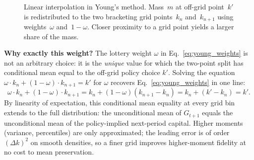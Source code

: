 \documentclass[11pt,a4paper]{report}
\newcommand{\x}{\bm{x}}
\begin{document}
\begin{figure}[ht]
\centering
{}
\caption{Linear interpolation in Young's method.  Mass~$m$ at off-grid point~$k'$ is redistributed to the two bracketing grid points~$k_n$ and~$k_{n+1}$ using weights~$\omega$ and~$1-\omega$.  Closer proximity to a grid point yields a larger share of the mass.}
\label{fig:young_interp}
\end{figure}

\medskip\noindent\textbf{Why exactly this weight?}
The lottery weight $\omega$ in Eq.~\eqref{eq:young_weights} is not an arbitrary choice: it is the \emph{unique} value for which the two-point split has conditional mean equal to the off-grid policy choice $k'$.  Solving the equation $\omega\cdot k_n + (1-\omega)\cdot k_{n+1} = k'$ for $\omega$ recovers Eq.~\eqref{eq:young_weights} in one line:
\begin{equation}
\omega\cdot k_n + (1-\omega)\cdot k_{n+1} = k_n + (1-\omega)(k_{n+1} - k_n) = k_n + (k' - k_n) = k'.
\label{eq:young_meanpreserve}
\end{equation}
By linearity of expectation, this conditional mean equality at every grid bin extends to the full distribution: the unconditional mean of $G_{t+1}$ equals the unconditional mean of the policy-implied next-period capital.  Higher moments (variance, percentiles) are only approximated; the leading error is of order $(\Delta k)^2$ on smooth densities, so a finer grid improves higher-moment fidelity at no cost to mean preservation.
\end{document}
